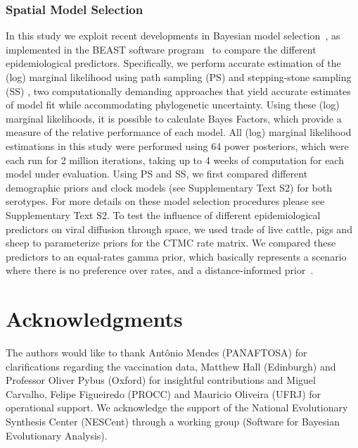 \documentclass[10pt]{article}
\begin{document}
\subsubsection*{Spatial Model Selection}

In this study we exploit recent developments in Bayesian model selection~\cite{Baele2012,Baele2013a,Baele2013b}, as implemented in the BEAST software program~\cite{beast2012} to compare the different epidemiological predictors.
Specifically, we perform accurate estimation of the (log) marginal likelihood using path sampling (PS) \cite{LartillotPhilippe} and stepping-stone sampling (SS) \cite{Xie}, two computationally demanding approaches that yield accurate estimates of model fit while accommodating phylogenetic uncertainty.
Using these (log) marginal likelihoods, it is possible to calculate Bayes Factors, which provide a measure of the relative performance of each model. 
All (log) marginal likelihood estimations in this study were performed using 64 power posteriors, which were each run for 2 million iterations, taking up to 4 weeks of computation for each model under evaluation. 
Using PS and SS, we first compared different demographic priors and clock models (see Supplementary Text S2) for both serotypes. 
For more details on these model selection procedures please see Supplementary Text S2.
To test the influence of different epidemiological predictors on viral diffusion through space, we used trade of live cattle, pigs and sheep to parameterize priors for the CTMC rate matrix.
We compared these predictors to an equal-rates gamma prior, which basically represents a scenario where there is no preference over rates, and a distance-informed prior~\cite{roots}.

\section*{Acknowledgments}
The authors would like to thank Ant\^onio Mendes (PANAFTOSA) for clarifications regarding the vaccination data, Matthew Hall (Edinburgh) and Professor Oliver Pybus (Oxford) for insightful contributions and Miguel Carvalho, Felipe Figueiredo (PROCC) and Mauricio Oliveira (UFRJ) for operational support.
We acknowledge the support of the National Evolutionary Synthesis Center (NESCent) through a working group (Software for Bayesian Evolutionary Analysis).
\end{document}
